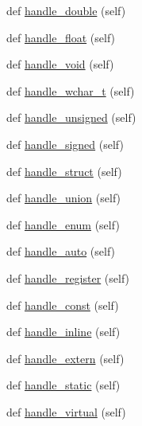 \begin{DoxyCompactItemize}
def \mbox{\hyperlink{classcpp_1_1ast_1_1_ast_builder_ad1bd68af800dafcafdfa56e474f9d642}{handle\+\_\+double}} (self)
\item 
def \mbox{\hyperlink{classcpp_1_1ast_1_1_ast_builder_aabe3f6d67124181a8cd2665a4562d4f6}{handle\+\_\+float}} (self)
\item 
def \mbox{\hyperlink{classcpp_1_1ast_1_1_ast_builder_a7a8f94909d4080bad2bc5dabd934057b}{handle\+\_\+void}} (self)
\item 
def \mbox{\hyperlink{classcpp_1_1ast_1_1_ast_builder_a4ec65909aea14f45709733d631aed57b}{handle\+\_\+wchar\+\_\+t}} (self)
\item 
def \mbox{\hyperlink{classcpp_1_1ast_1_1_ast_builder_a793123ea878db159de1662c10bdae897}{handle\+\_\+unsigned}} (self)
\item 
def \mbox{\hyperlink{classcpp_1_1ast_1_1_ast_builder_a61c1e82b2b4fdc337cf360e485851390}{handle\+\_\+signed}} (self)
\item 
def \mbox{\hyperlink{classcpp_1_1ast_1_1_ast_builder_aadfad5b8d50962c04504e806dc0f5b6c}{handle\+\_\+struct}} (self)
\item 
def \mbox{\hyperlink{classcpp_1_1ast_1_1_ast_builder_a9b3fbfb21c6e23f04fd596d590f93eee}{handle\+\_\+union}} (self)
\item 
def \mbox{\hyperlink{classcpp_1_1ast_1_1_ast_builder_a341a6ffabadd444a345c8c98a611774c}{handle\+\_\+enum}} (self)
\item 
def \mbox{\hyperlink{classcpp_1_1ast_1_1_ast_builder_a0cb490894f17a6c34fbe6bb8f7a2e626}{handle\+\_\+auto}} (self)
\item 
def \mbox{\hyperlink{classcpp_1_1ast_1_1_ast_builder_a890e7764fc5fd8ad2da3a62e436278a0}{handle\+\_\+register}} (self)
\item 
def \mbox{\hyperlink{classcpp_1_1ast_1_1_ast_builder_a9d24135000a6fb4a3daabb5ab8883648}{handle\+\_\+const}} (self)
\item 
def \mbox{\hyperlink{classcpp_1_1ast_1_1_ast_builder_ab2eb0c18c07584ef246a46865a17ec40}{handle\+\_\+inline}} (self)
\item 
def \mbox{\hyperlink{classcpp_1_1ast_1_1_ast_builder_a49039750d971240a270606f0608c1ff0}{handle\+\_\+extern}} (self)
\item 
def \mbox{\hyperlink{classcpp_1_1ast_1_1_ast_builder_ad98bc262537d2882adc2017023cef6aa}{handle\+\_\+static}} (self)
\item 
def \mbox{\hyperlink{classcpp_1_1ast_1_1_ast_builder_a44710dc0b8e5bdbecaa56f7c4b59c046}{handle\+\_\+virtual}} (self)
\item 

\end{DoxyCompactItemize}
